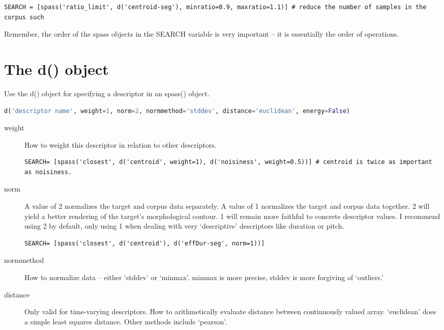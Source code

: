 \documentclass{article}
\begin{document}
\begin{spacing}{1.2}
\begin{lstlisting}
SEARCH = [spass('ratio_limit', d('centroid-seg'), minratio=0.9, maxratio=1.1)] # reduce the number of samples in the corpus such 
\end{lstlisting}

Remember, the order of the spass objects in the SEARCH variable is very important -- it is essentially the order of operations.

\section{The d() object}
Use the d() object for specifying a descriptor in an spass() object.

 \begin{lstlisting}[language=python]
d('descriptor name', weight=1, norm=2, normmethod='stddev', distance='euclidean', energy=False)
\end{lstlisting}
 
\begin{description}

\item[weight] How to weight this descriptor in relation to other descriptors.

\begin{lstlisting}
SEARCH= [spass('closest', d('centroid', weight=1), d('noisiness', weight=0.5))] # centroid is twice as important as noisiness.
\end{lstlisting}

\item[norm] A value of 2 normalizes the target and corpus data separately.  A value of 1 normalizes the target and corpus data together.  2 will yield a better rendering of the target's morphological contour.  1 will remain more faithful to concrete descriptor values.  I recommend using 2 by default, only using 1 when dealing with very `descriptive' descriptors like duration or pitch.

\begin{lstlisting}
SEARCH= [spass('closest', d('centroid'), d('effDur-seg', norm=1))]
\end{lstlisting}

\item[normmethod] How to normalize data -- either `stddev' or `minmax'.  minmax is more precise, stddev is more forgiving of `outliers.'

\item[distance] Only valid for time-varying descriptors.  How to arithmetically evaluate distance between continuously valued array.  `euclidean' does a simple least squares distance.  Other methods include `pearson'.


\end{description}
\end{spacing}
\end{document}
